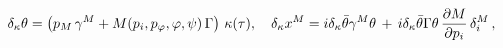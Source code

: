 \begin{equation}\label{33}
\delta_\kappa\theta=\left(p_M\,\gamma^M+M(p_i,p_{\varphi},\varphi,\psi)\,
\Gamma\right)\,\kappa(\tau), \quad \delta_\kappa
x^M=i\delta_\kappa\bar\theta\gamma^M\theta\,
+\,i\delta_\kappa\bar\theta\Gamma\theta\,{{\partial
M}\over{\partial p_i}}\,\delta^M_i\,,
\end{equation}

